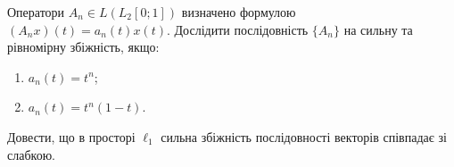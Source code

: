 \begin{exercise}
    Оператори $A_n \in L(L_2[0;1])$ визначено формулою $(A_n x)(t) = a_n(t) x(t)$.
    Дослідити послідовність $\{A_n\}$ на сильну та рівномірну збіжність, якщо:
    \begin{enumerate}
        \item $a_n(t) = t^n$;
        \item $a_n(t) = t^n (1-t)$.
    \end{enumerate}
\end{exercise}

\begin{exercise*}
    Довести, що в просторі $\ell_1$ сильна збіжність послідовності векторів співпадає зі слабкою.
\end{exercise*}